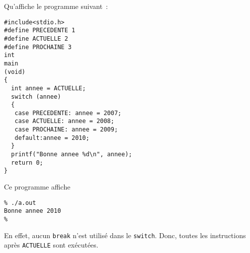 Qu'affiche le programme suivant~:
\begin{verbatim}
#include<stdio.h>
#define PRECEDENTE 1
#define ACTUELLE 2
#define PROCHAINE 3
int
main
(void) 
{
  int annee = ACTUELLE;
  switch (annee) 
  {
   case PRECEDENTE: annee = 2007;
   case ACTUELLE: annee = 2008;
   case PROCHAINE: annee = 2009;
   default:annee = 2010;
  }
  printf("Bonne annee %d\n", annee);
  return 0;
}
\end{verbatim}
\ifcorrection
\begin{correction}
Ce programme affiche
\begin{verbatim}
% ./a.out 
Bonne annee 2010
% 
\end{verbatim}
En effet, aucun \verb+break+ n'est utilis\'e dans le \verb+switch+.
Donc, toutes les instructions apr\`es \verb+ACTUELLE+ sont ex\'ecut\'ees.
\end{correction}
\fi
